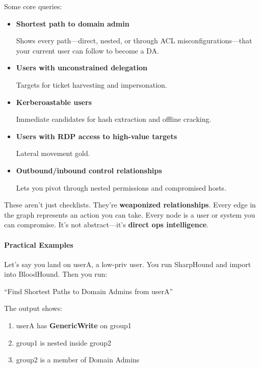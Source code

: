 Some core queries:

\begin{itemize}
    \item \textbf{Shortest path to domain admin}

 Shows every path—direct, nested, or through ACL misconfigurations—that your current user can follow to become a DA.

    \item \textbf{Users with unconstrained delegation}

Targets for ticket harvesting and impersonation.

    \item \textbf{Kerberoastable users}

Immediate candidates for hash extraction and offline cracking.

    \item \textbf{Users with RDP access to high-value targets}

Lateral movement gold.

    \item \textbf{Outbound/inbound control relationships}

Lets you pivot through nested permissions and compromised hosts.

\end{itemize}
These aren’t just checklists. They’re \textbf{weaponized relationships}. Every edge in the graph represents an action you can take. Every node is a user or system you can compromise. It’s not abstract—it’s \textbf{direct ops intelligence}.

\paragraph{\textbf{   Practical Examples}}

Let’s say you land on userA, a low-priv user. You run SharpHound and import into BloodHound. Then you run:

“Find Shortest Paths to Domain Admins from userA”

The output shows:

\begin{enumerate}
    \item userA has \textbf{GenericWrite} on group1

    \item group1 is nested inside group2

    \item group2 is a member of Domain Admins

\end{enumerate}

